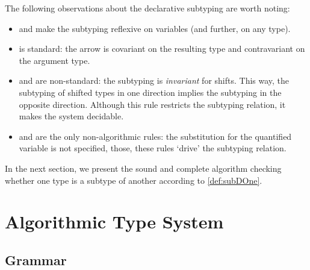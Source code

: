 \documentclass[acmsmall,natbib=false,review,anonymous]{acmart}
\begin{document}
\begin{definition} 
  \label{def:subDOne}
  \hfill
  
  \begin{multicols}{2}
    \ottdefnDOneNsub{}

    \ottdefnDOnePsup{}
  \end{multicols}
  \hfill

  \begin{multicols}{2}
    \ottdefnDOneNeq{}

    \ottdefnDOnePeq{}
  \end{multicols}
\end{definition}

The following observations about the declarative subtyping are worth noting:
\begin{itemize}
  \item {} and 
    make the subtyping reflexive on variables (and further, on any type).
  \item {} is standard: the arrow is covariant on the
    resulting type and contravariant on the argument type.
  \item {}  and  are non-standard:
    the subtyping is \emph{invariant} for shifts. 
    This way, the subtyping of shifted types in one direction implies the subtyping
    in the opposite direction.
    Although this rule restricts the
    subtyping relation, it makes the system decidable.
  \item {} and  are the only
    non-algorithmic rules: the substitution for the quantified variable is
    not specified, those, these rules `drive' the subtyping relation.
\end{itemize}

In the next section, we present the sound and complete algorithm
checking whether one type is a subtype of another according to \cref{def:subDOne}. 

\section{Algorithmic Type System}

\subsection{Grammar}
\end{document}
